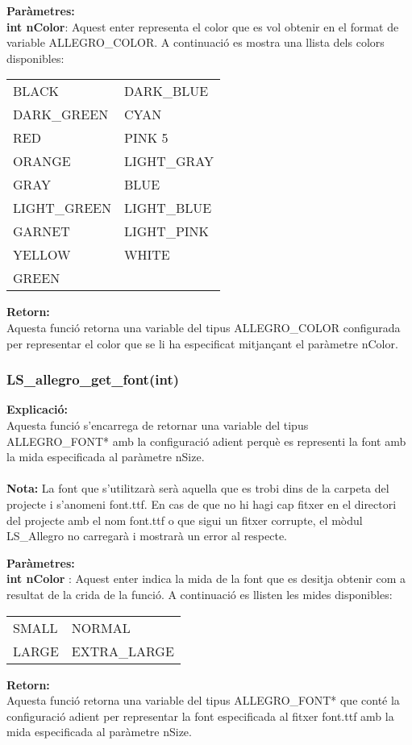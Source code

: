 \documentclass[11pt]{article}
\begin{document}
\noindent \textbf{Paràmetres:}\\
\textbf{int nColor}: Aquest enter representa el color que es vol obtenir en el format de variable ALLEGRO\_COLOR. A continuació es mostra una llista dels colors disponibles:
\begin{center}
\begin{tabular}{l|l}
BLACK  & DARK\_BLUE \\
DARK\_GREEN & CYAN \\
RED  &  PINK 5 \\
ORANGE  & LIGHT\_GRAY \\
GRAY & BLUE \\
LIGHT\_GREEN  & LIGHT\_BLUE \\
GARNET  & LIGHT\_PINK \\
YELLOW & WHITE \\
GREEN \\
\end{tabular}
\end{center}

\noindent \textbf{Retorn:} \\
Aquesta funció retorna una variable del tipus ALLEGRO\_COLOR configurada per representar el color que se li ha especificat mitjançant el paràmetre nColor.

\pagebreak
\subsubsection{LS\_allegro\_get\_font(int)}
\textbf{Explicació:}\\
Aquesta funció s'encarrega de retornar una variable del tipus ALLEGRO\_FONT* amb la configuració adient perquè es representi la font amb la mida especificada al paràmetre nSize.\\\\
\textbf{Nota:} La font que s'utilitzarà serà aquella que es trobi dins de la carpeta del projecte i s'anomeni font.ttf. En cas de que no hi hagi cap fitxer en el directori del projecte amb el nom font.ttf o que sigui un fitxer corrupte, el mòdul LS\_Allegro no carregarà i mostrarà un error al respecte.

\noindent \textbf{Paràmetres:}\\
\textbf{int nColor} : Aquest enter indica la mida de la font que es desitja obtenir com a resultat de la crida de la funció. A continuació es llisten les mides disponibles:

\begin{center}
\begin{tabular}{l|l}
SMALL & NORMAL\\
LARGE & EXTRA\_LARGE\\
\end{tabular}
\end{center}

\noindent \textbf{Retorn:}\\
Aquesta funció retorna una variable del tipus ALLEGRO\_FONT* que conté la configuració adient per representar la font especificada al fitxer font.ttf amb la mida especificada al paràmetre nSize.
\end{document}
